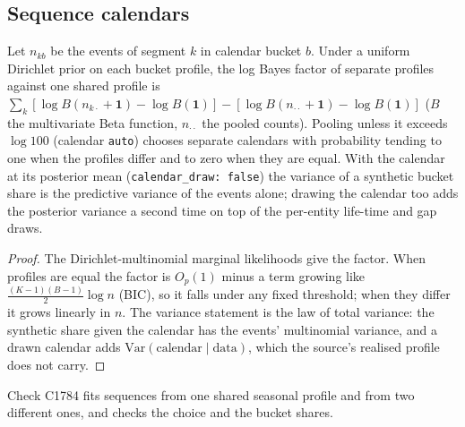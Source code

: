 \subsection*{Sequence calendars}
\setcounter{proposition}{1783}
\begin{proposition}\label{prop:poolcal}
Let $n_{kb}$ be the events of segment $k$ in calendar bucket $b$. Under a uniform Dirichlet prior on each bucket profile, the log Bayes factor of separate profiles against one shared profile is $\sum_k[\log B(n_{k\cdot}+\mathbf 1)-\log B(\mathbf 1)]-[\log B(n_{\cdot\cdot}+\mathbf 1)-\log B(\mathbf 1)]$ ($B$ the multivariate Beta function, $n_{\cdot\cdot}$ the pooled counts). Pooling unless it exceeds $\log 100$ (calendar \texttt{auto}) chooses separate calendars with probability tending to one when the profiles differ and to zero when they are equal. With the calendar at its posterior mean (\texttt{calendar\_draw: false}) the variance of a synthetic bucket share is the predictive variance of the events alone; drawing the calendar too adds the posterior variance a second time on top of the per-entity life-time and gap draws.
\end{proposition}
\begin{proof}
The Dirichlet-multinomial marginal likelihoods give the factor. When profiles are equal the factor is $O_p(1)$ minus a term growing like $\tfrac{(K-1)(B-1)}{2}\log n$ (BIC), so it falls under any fixed threshold; when they differ it grows linearly in $n$. The variance statement is the law of total variance: the synthetic share given the calendar has the events' multinomial variance, and a drawn calendar adds $\mathrm{Var}(\text{calendar}\mid\text{data})$, which the source's realised profile does not carry.
\end{proof}
\noindent Check C1784 fits sequences from one shared seasonal profile and from two different ones, and checks the choice and the bucket shares.

